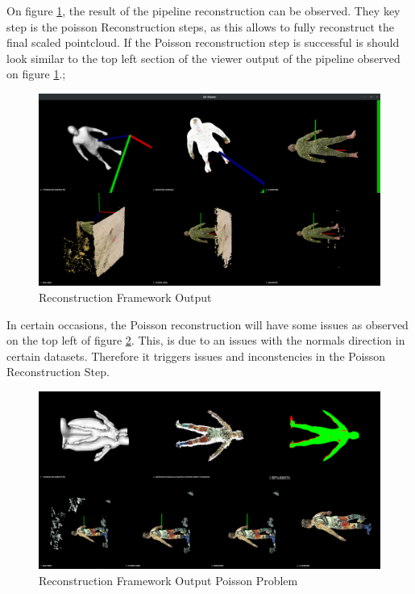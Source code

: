 \documentclass[12pt]{report}
\begin{document}
On figure \ref{fig:pcl_result1}, the result of the pipeline reconstruction can be observed. 
They key step is the poisson Reconstruction steps, as this allows to fully reconstruct the final scaled pointcloud.
If the Poisson reconstruction step is successful is should look similar to the top left section of the viewer output of the pipeline observed on figure \ref{fig:pcl_result1}.;

\begin{figure}[H]%
  \centering
 \includegraphics[width=1\textwidth]{3D Viewer_030.png}
\caption{Reconstruction Framework Output}
\label{fig:pcl_result1} 
\end{figure}


In certain occasions, the  Poisson reconstruction will  have some issues as observed on the top left of figure \ref{fig:pcl_result2}.
This, is due to an issues with the normals direction in certain datasets. Therefore it triggers issues and inconstencies in the Poisson Reconstruction Step.
\begin{figure}[H]%
  \centering
 \includegraphics[width=1\textwidth]{pipeline.png}
\caption{Reconstruction Framework Output Poisson Problem}
\label{fig:pcl_result2} 
\end{figure}
 
\end{document}
